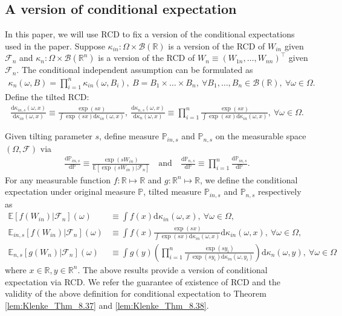 \documentclass[12pt]{article}
\theoremstyle{definition}
\def\P{\mathbb{P}}
\def\P{\mathbb{P}}
\newcommand{\E}{\mathbb E}								%
\renewcommand{\P}{\mathbb{P}}							%
\begin{document}
\subsection{A version of conditional expectation}

In this paper, we will use RCD to fix a version of the conditional expectations used in the paper. Suppose $\kappa_{in}:\Omega\times \mathcal{B}(\mathbb{R})$ is a version of the RCD of $W_{in}$ given $\mathcal{F}_n$ and $\kappa_{n}:\Omega\times \mathcal{B}(\mathbb{R}^n)$ is a version of the RCD of $W_n\equiv (W_{1n},\ldots,W_{nn})^\top$ given $\mathcal{F}_n$. The conditional independent assumption can be formulated as 
\begin{align*}
	\kappa_{n}(\omega,B)=\prod_{i=1}^n \kappa_{in}(\omega,B_i),\ B=B_1\times\ldots\times B_n,\ \forall B_1,\ldots,B_n\in \mathcal{B}(\mathbb{R}),\ \forall \omega\in \Omega.
\end{align*}
Define the tilted RCD:
\begin{align*}
	\frac{\mathrm{d}\kappa_{in,s}(\omega,x)}{\mathrm{d}\kappa_{in}(\omega,x)}\equiv \frac{\exp(sx)}{\int \exp(sx)\mathrm{d}\kappa_{in}(\omega,x)},\ \frac{\mathrm{d}\kappa_{n,s}(\omega,x)}{\mathrm{d}\kappa_{n}(\omega,x)}\equiv\prod_{i=1}^n \frac{\exp(sx)}{\int \exp(sx)\mathrm{d}\kappa_{in}(\omega,x)},\ \forall \omega\in\Omega.
\end{align*}

Given tilting parameter $s$, define measure $\P_{in,s}$ and $\P_{n,s}$ on the measurable space $(\Omega, \mathcal F)$ via 
\begin{align*}
	\frac{\mathrm{d}\P_{in,s}}{\mathrm{d}\P} \equiv \frac{\exp(s W_{in})}{\E[\exp(s W_{in})|\mathcal F_n]}\quad\text{and}\quad \frac{\mathrm{d}\P_{n,s}}{\mathrm{d}\P}\equiv \prod_{i = 1}^n\frac{\mathrm{d}\P_{in,s}}{\mathrm{d}\P}.
\end{align*}
For any measurable function $f:\mathbb{R}\mapsto\mathbb{R}$ and $g:\mathbb{R}^n\mapsto\mathbb{R}$, we define the conditional expectation under original measure $\P$, tilted measure $\P_{in,s}$ and $\P_{n,s}$ respectively as
\begin{align}
	\E[f(W_{in})|\mathcal{F}_n](\omega)
	&\label{eq:def_conditional_expectation}
	\equiv \int f(x)\mathrm{d}\kappa_{in}(\omega,x),\ \forall \omega\in\Omega,\\ 
	\E_{in,s}[f(W_{in})|\mathcal{F}_n](\omega)
	&\label{eq:def_conditional_expectation_tilted}
	\equiv\int f(x)\frac{\exp(sx)}{\int \exp(sx)\mathrm{d}\kappa_{in}(\omega,x)}\mathrm{d}\kappa_{in}(\omega,x),\ \forall \omega\in\Omega,\\
	\E_{n,s}[g(W_{n})|\mathcal{F}_n](\omega)
	&\label{eq:def_conditional_expectation_tilted_product}
	\equiv\int g(y)\left(\prod_{i=1}^n \frac{\exp(sy_i)}{\int \exp(sy_i)\mathrm{d}\kappa_{in}(\omega,y_i)}\right)\mathrm{d}\kappa_{n}(\omega,y),\ \forall \omega\in\Omega
\end{align}
where $x\in\mathbb{R},y\in\mathbb{R}^n$. The above results provide a version of conditional expectation via RCD. We refer the guarantee of existence of RCD and the validity of the above definition for conditional expectation to Theorem \ref{lem:Klenke_Thm_8.37} and \ref{lem:Klenke_Thm_8.38}.
\end{document}
